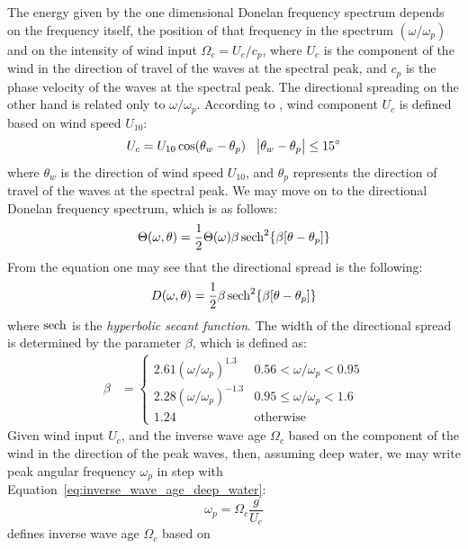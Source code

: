 The energy given by the one dimensional Donelan frequency spectrum depends on 
the frequency itself, the position of that frequency in the spectrum 
$(\omega/\omega_p)$ and on the intensity of wind input $\Omega_c = U_c/c_p$, 
where $U_c$ is the component of the wind in the direction 
of travel of the waves at the spectral peak, and $c_p$ is the phase velocity of 
the waves at the spectral peak. The directional spreading on the other hand is 
related only to $\omega/\omega_p$.
According to \citeauthor{article:Donelan1985}, wind component $U_c$ is defined
based on wind speed $U_{10}$:
\begin{align}
 U_c = U_{10}\cos(\theta_w-\theta_p) && \abs{\theta_w-\theta_p}\leq\SI{15}{\degree}
\end{align}
where $\theta_w$ is the direction of wind speed $U_{10}$, and $\theta_p$
represents the direction of travel of the waves at the spectral peak.
We may move on to the directional Donelan frequency spectrum,
which is as follows:
\begin{equation}
\label{eq:donelan:dfreqspectrum}
 \Theta(\omega, \theta) = \frac{1}{2}\Theta(\omega)\beta\operatorname{sech}^2
\{\beta[\theta - \theta_p]\}
\end{equation}
From the equation one may see that the directional spread is the following:
\begin{equation}
\label{eq:donelan:dspread}
  D(\omega, \theta) = \frac{1}{2}\beta\operatorname{sech}^2\{\beta[\theta - \theta_p]\}
\end{equation}
where $\operatorname{sech}$ is the \emph{hyperbolic secant function}.
The width of the directional spread is determined by the
parameter $\beta$, which is defined as:
\begin{align}
\label{eq:donelan:beta}
\beta &= \begin{cases}
	2.61(\omega/\omega_p)^{1.3} & 0.56 < \omega/\omega_p < 0.95\\
	2.28(\omega/\omega_p)^{-1.3} & 0.95 \leq \omega/\omega_p < 1.6\\
	1.24 & \text{otherwise}
    \end{cases}
\end{align}
Given wind input $U_c$, and the inverse wave age $\Omega_c$ based on the
component of the wind in the direction of the peak waves, then, assuming deep
water, we may write peak angular frequency $\omega_p$ in step with
Equation~\ref{eq:inverse_wave_age_deep_water}:
\begin{equation}
 \omega_{p} = \Omega_c\frac{g}{U_{c}}
\end{equation}
\citeauthor{article:Donelan1985} defines inverse wave age $\Omega_c$ based on
